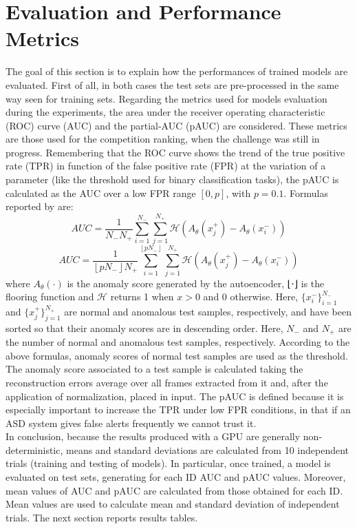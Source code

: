 \section{Evaluation and Performance Metrics}
The goal of this section is to explain how the performances of trained models are evaluated. First of all, in both cases the test sets are pre-processed in the same way seen for training sets. Regarding the metrics used for models evaluation during the experiments, the area under the receiver operating characteristic (ROC) curve (AUC) and the partial-AUC (pAUC) are considered. These metrics are those used for the competition ranking, when the challenge was still in progress. Remembering that the ROC curve shows the trend of the true positive rate (TPR) in function of the false positive rate (FPR) at the variation of a parameter (like the threshold used for binary classification tasks), the pAUC is calculated as the AUC over a low FPR range $[0,p]$, with $p=0.1$. Formulas reported by \cite{DCASE} are:
\[ AUC =\frac{1}{N_-N_+}\sum_{i=1}^{N_-}\sum_{j=1}^{N_+}\mathcal{H}(A_\theta(x_j^+)-A_\theta(x_i^-)) \]
\[AUC =\frac{1}{ \left \lfloor pN_- \right \rfloor N_+}\sum_{i=1}^{ \left \lfloor pN_- \right \rfloor }\sum_{j=1}^{N_+}\mathcal{H}(A_\theta(x_j^+)-A_\theta(x_i^-))\]
where $A_\theta(\cdot)$ is the anomaly score generated by the autoencoder, ⌊⋅⌋ is the flooring function and $\mathcal{H}$ returns 1 when $x>0$ and $0$ otherwise. Here, $\{x^−_i\}^{N_-}_{i=1}$
and $\{x^+_j\}^{N_+}_{j=1}$ are normal and anomalous test samples, respectively, and have been sorted so that their anomaly scores are in descending order. Here, $N_−$ and $N_+$
are the number of normal and anomalous test samples, respectively. According to the above formulas, anomaly scores of normal test samples are used as the threshold. The anomaly score associated to a test sample is calculated taking the reconstruction errors average over all frames extracted from it and, after the application of normalization, placed in input. The pAUC is defined because it is especially important to increase the TPR under low FPR conditions, in that if an ASD system gives false alerts frequently we cannot trust it. \\
In conclusion, because the results produced with a GPU are generally non-deterministic, means and standard deviations are calculated from 10 independent trials (training and testing of models). In particular, once trained, a model is evaluated on test sets, generating for each ID AUC and pAUC values. Moreover, mean values of AUC and pAUC are calculated from those obtained for each ID. Mean values are used to calculate mean and standard deviation of independent trials. The next section reports results tables.
